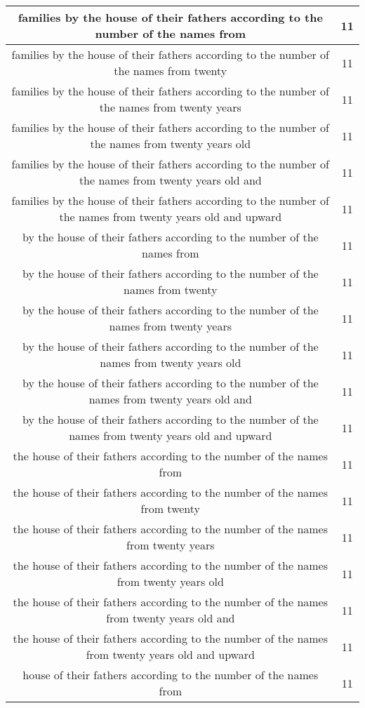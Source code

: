 \begin{center}
\begin{longtable}{|c|c|}
families by the house of their fathers according to the number of the names from & 11\\ \hline 
families by the house of their fathers according to the number of the names from twenty & 11\\ \hline 
families by the house of their fathers according to the number of the names from twenty years & 11\\ \hline 
families by the house of their fathers according to the number of the names from twenty years old & 11\\ \hline 
families by the house of their fathers according to the number of the names from twenty years old and & 11\\ \hline 
families by the house of their fathers according to the number of the names from twenty years old and upward & 11\\ \hline 
by the house of their fathers according to the number of the names from & 11\\ \hline 
by the house of their fathers according to the number of the names from twenty & 11\\ \hline 
by the house of their fathers according to the number of the names from twenty years & 11\\ \hline 
by the house of their fathers according to the number of the names from twenty years old & 11\\ \hline 
by the house of their fathers according to the number of the names from twenty years old and & 11\\ \hline 
by the house of their fathers according to the number of the names from twenty years old and upward & 11\\ \hline 
the house of their fathers according to the number of the names from & 11\\ \hline 
the house of their fathers according to the number of the names from twenty & 11\\ \hline 
the house of their fathers according to the number of the names from twenty years & 11\\ \hline 
the house of their fathers according to the number of the names from twenty years old & 11\\ \hline 
the house of their fathers according to the number of the names from twenty years old and & 11\\ \hline 
the house of their fathers according to the number of the names from twenty years old and upward & 11\\ \hline 
house of their fathers according to the number of the names from & 11\\ \hline 

\end{longtable}
\end{center}
